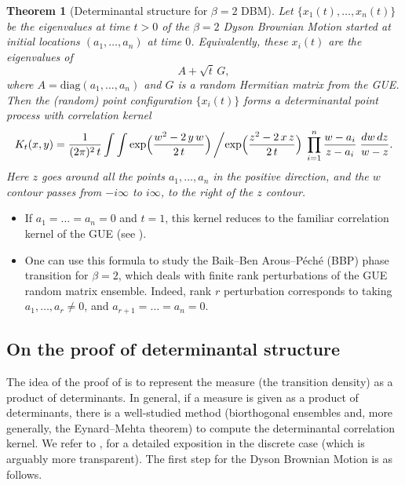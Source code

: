 \documentclass[letterpaper,11pt,oneside,reqno]{book}
\numberwithin{equation}{chapter}  %
\newtheorem{theorem}[proposition]{Theorem}
\theoremstyle{definition}
\begin{document}
\begin{theorem}[Determinantal structure for $\beta=2$ DBM]
\label{lecture11:thm:dbm-det-kernel}
Let $\{x_1(t),\dots,x_n(t)\}$ be the eigenvalues at time $t>0$ of the $\beta=2$ Dyson Brownian Motion started at initial locations $(a_1,\dots,a_n)$ at time $0$.  Equivalently, these $x_i(t)$ are the eigenvalues of
\[
A + \sqrt{t}\,G,
\]
where $A=\mathrm{diag}(a_1,\dots,a_n)$ and $G$ is a random Hermitian matrix from the GUE.  Then the (random) point configuration $\{x_i(t)\}$ forms a determinantal point process with correlation kernel
\[
K_t(x,y)
=
\frac{1}{(2\pi)^2\,t}
\int \int
\exp\Bigl(\frac{w^2 - 2\,y\,w}{2\,t}\Bigr)\,
\biggl/
\exp\Bigl(\frac{z^2 - 2\,x\,z}{2\,t}\Bigr)
\;\prod_{i=1}^n \frac{w - a_i}{z - a_i}
\;\frac{dw\,dz}{w - z}.
\]
Here $z$ goes around all the points $a_1,\ldots,a_n $ in the positive direction,
and the $w$ contour
passes from $-i\infty$ to $i\infty$, to the right of the $z$ contour.
\end{theorem}

\begin{itemize}
	\item If $a_1=\dots=a_n=0$ and $t=1$, this kernel reduces to the familiar correlation kernel of the GUE (see ).
\item
	One can use this formula to study the Baik--Ben
	Arous--P\'ech\'e (BBP)
	\cite{BBP2005phase}
	phase transition for $\beta=2$,
	which deals with finite rank perturbations of the GUE random matrix ensemble.
	Indeed, rank $r$ perturbation corresponds to taking $a_1,\ldots,a_r\ne0 $,
	and $a_{r+1}=\dots=a_n=0$.
\end{itemize}

\subsection{On the proof of determinantal structure}

The idea of the proof of  is to
represent the measure (the transition density) as a
product of determinants. In general,
if a measure is given as a product of determinants,
there is a well-studied method (biorthogonal ensembles and,
more generally, the Eynard--Mehta theorem)
to compute the determinantal correlation kernel.
We refer to
\cite{borodin2005eynard},
\cite{Borodin2009} for a detailed exposition
in the discrete case (which is arguably more transparent).
The first step for the Dyson Brownian Motion is as follows.
\end{document}
